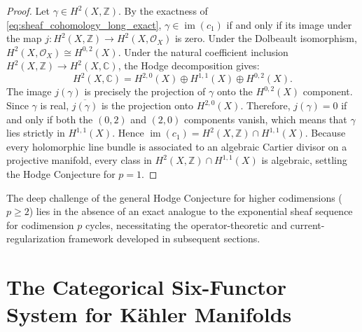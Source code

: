 \documentclass[11pt,a4paper]{article}
\theoremstyle{definition}
\theoremstyle{plain}
\DeclareMathOperator{\im}{im}
\begin{document}
\begin{proof}
Let $\gamma \in H^2(X, \mathbb{Z})$. By the exactness of \eqref{eq:sheaf_cohomology_long_exact}, $\gamma \in \im(c_1)$ if and only if its image under the map $j: H^2(X, \mathbb{Z}) \to H^2(X, \mathcal{O}_X)$ is zero. Under the Dolbeault isomorphism, $H^2(X, \mathcal{O}_X) \cong H^{0,2}(X)$. Under the natural coefficient inclusion $H^2(X, \mathbb{Z}) \to H^2(X, \mathbb{C})$, the Hodge decomposition gives:
\begin{equation}
    H^2(X, \mathbb{C}) = H^{2,0}(X) \oplus H^{1,1}(X) \oplus H^{0,2}(X).
\end{equation}
The image $j(\gamma)$ is precisely the projection of $\gamma$ onto the $H^{0,2}(X)$ component. Since $\gamma$ is real, $\overline{j(\gamma)}$ is the projection onto $H^{2,0}(X)$. Therefore, $j(\gamma) = 0$ if and only if both the $(0,2)$ and $(2,0)$ components vanish, which means that $\gamma$ lies strictly in $H^{1,1}(X)$. Hence $\im(c_1) = H^2(X, \mathbb{Z}) \cap H^{1,1}(X)$. Because every holomorphic line bundle is associated to an algebraic Cartier divisor on a projective manifold, every class in $H^2(X, \mathbb{Z}) \cap H^{1,1}(X)$ is algebraic, settling the Hodge Conjecture for $p = 1$.
\end{proof}

The deep challenge of the general Hodge Conjecture for higher codimensions ($p \ge 2$) lies in the absence of an exact analogue to the exponential sheaf sequence for codimension $p$ cycles, necessitating the operator-theoretic and current-regularization framework developed in subsequent sections.

\section{The Categorical Six-Functor System for Kähler Manifolds}
\label{sec:system}
\end{document}
